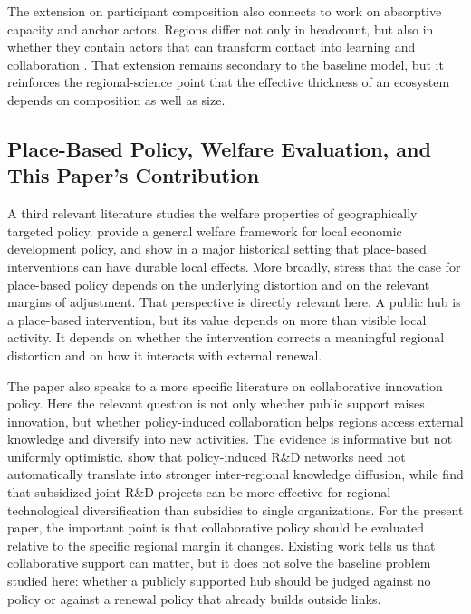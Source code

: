 The extension on participant composition also connects to work on absorptive capacity and anchor actors. Regions differ not only in headcount, but also in whether they contain actors that can transform contact into learning and collaboration \citep{CohenLevinthal1990,AgrawalCockburn2003}. That extension remains secondary to the baseline model, but it reinforces the regional-science point that the effective thickness of an ecosystem depends on composition as well as size.

\subsection{Place-Based Policy, Welfare Evaluation, and This Paper's Contribution}

A third relevant literature studies the welfare properties of geographically targeted policy. \citet{KlineMoretti2014ARE} provide a general welfare framework for local economic development policy, and \citet{KlineMoretti2014QJE} show in a major historical setting that place-based interventions can have durable local effects. More broadly, \citet{NeumarkSimpson2015} stress that the case for place-based policy depends on the underlying distortion and on the relevant margins of adjustment. That perspective is directly relevant here. A public hub is a place-based intervention, but its value depends on more than visible local activity. It depends on whether the intervention corrects a meaningful regional distortion and on how it interacts with external renewal.

The paper also speaks to a more specific literature on collaborative innovation policy. Here the relevant question is not only whether public support raises innovation, but whether policy-induced collaboration helps regions access external knowledge and diversify into new activities. The evidence is informative but not uniformly optimistic. \citet{BednarzBroekel2019} show that policy-induced R\&D networks need not automatically translate into stronger inter-regional knowledge diffusion, while \citet{MewesBroekel2020} find that subsidized joint R\&D projects can be more effective for regional technological diversification than subsidies to single organizations. For the present paper, the important point is that collaborative policy should be evaluated relative to the specific regional margin it changes. Existing work tells us that collaborative support can matter, but it does not solve the baseline problem studied here: whether a publicly supported hub should be judged against no policy or against a renewal policy that already builds outside links.

